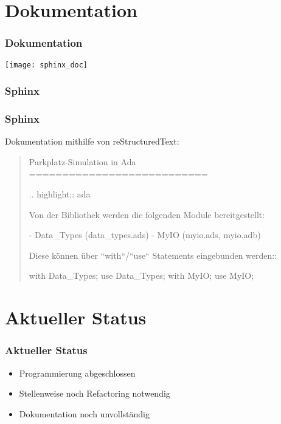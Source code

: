 \documentclass[ngerman]{presentation}
\begin{document}
\section{Dokumentation}
\label{sec:dokumentation}

\begin{frame}[c,label=dokumentation]
    \frametitle{Dokumentation}

    \vspace{-0.6cm}
    \begin{center}
    \texttt{[image: sphinx\_doc]}
    \end{center}
\end{frame}

\subsubsection{Sphinx}
\label{sec:sphinx}

\begin{frame}[c,label=sphinx,fragile]
    \frametitle{Sphinx}
    
    Dokumentation mithilfe von reStructuredText:

    \begin{quote}
        \normalfont
        \begin{restcode}
            Parkplatz-Simulation in Ada
            ===========================

            .. highlight:: ada

            Von der Bibliothek werden die folgenden Module bereitgestellt:

             - Data_Types (data_types.ads)
             - MyIO (myio.ads, myio.adb)

            Diese können über ``with``/``use`` Statements eingebunden werden::

               with Data_Types; use Data_Types;
               with MyIO; use MyIO;
        \end{restcode}
    \end{quote}
\end{frame}

\section{Aktueller Status}
\label{sec:aktueller_status}

\begin{frame}[c,label=aktueller_status]
    \frametitle{Aktueller Status}

    \begin{itemize}
        \item Programmierung abgeschlossen
        \item Stellenweise noch Refactoring notwendig
        \item Dokumentation noch unvollständig
    \end{itemize}
\end{frame}
\end{document}
